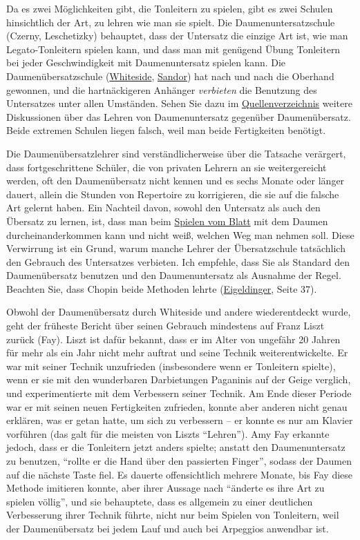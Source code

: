 Da es zwei Möglichkeiten gibt, die Tonleitern zu spielen, gibt es zwei Schulen hinsichtlich der Art, zu lehren wie man sie spielt.
Die Daumenuntersatzschule (Czerny, Leschetizky) behauptet, dass der Untersatz die einzige Art ist, wie man Legato-Tonleitern spielen kann, und dass man mit genügend Übung Tonleitern bei jeder Geschwindigkeit mit Daumenuntersatz spielen kann.
Die Daumenübersatzschule (\hyperref[Whiteside]{Whiteside}, \hyperref[Sandor]{Sandor}) hat nach und nach die Oberhand gewonnen, und die hartnäckigeren Anhänger \textit{verbieten} die Benutzung des Untersatzes unter allen Umständen.
Sehen Sie dazu im \hyperref[reference]{Quellenverzeichnis} weitere Diskussionen über das Lehren von Daumenuntersatz gegenüber Daumenübersatz.
Beide extremen Schulen liegen falsch, weil man beide Fertigkeiten benötigt.

Die Daumenübersatzlehrer sind verständlicherweise über die Tatsache verärgert, dass fortgeschrittene Schüler, die von privaten Lehrern an sie weitergereicht werden, oft den Daumenübersatz nicht kennen und es sechs Monate oder länger dauert, allein die Stunden von Repertoire zu korrigieren, die sie auf die falsche Art gelernt haben.
Ein Nachteil davon, sowohl den Untersatz als auch den Übersatz zu lernen, ist, dass man beim \hyperref[c1iii11]{Spielen vom Blatt} mit dem Daumen durcheinanderkommen kann und nicht weiß, welchen Weg man nehmen soll.
Diese Verwirrung ist ein Grund, warum manche Lehrer der Übersatzschule tatsächlich den Gebrauch des Untersatzes verbieten.
Ich empfehle, dass Sie als Standard den Daumenübersatz benutzen und den Daumenuntersatz als Ausnahme der Regel.
Beachten Sie, dass Chopin beide Methoden lehrte (\hyperref[Eigeldinger]{Eigeldinger}, Seite 37).

Obwohl der Daumenübersatz durch Whiteside und andere wiederentdeckt wurde, geht der früheste Bericht über seinen Gebrauch mindestens auf Franz Liszt zurück (Fay).
Liszt ist dafür bekannt, dass er im Alter von ungefähr 20 Jahren für mehr als ein Jahr nicht mehr auftrat und seine Technik weiterentwickelte.
Er war mit seiner Technik unzufrieden (insbesondere wenn er Tonleitern spielte), wenn er sie mit den wunderbaren Darbietungen Paganinis auf der Geige verglich, und experimentierte mit dem Verbessern seiner Technik.
Am Ende dieser Periode war er mit seinen neuen Fertigkeiten zufrieden, konnte aber anderen nicht genau erklären, was er getan hatte, um sich zu verbessern -- er konnte es nur am Klavier vorführen (das galt für die meisten von Liszts \enquote{Lehren}).
Amy Fay erkannte jedoch, dass er die Tonleitern jetzt anders spielte; anstatt den Daumenuntersatz zu benutzen, \enquote{rollte er die Hand über den passierten Finger}, sodass der Daumen auf die nächste Taste fiel.
Es dauerte offensichtlich mehrere Monate, bis Fay diese Methode imitieren konnte, aber ihrer Aussage nach \enquote{änderte es ihre Art zu spielen völlig}, und sie behauptete, dass es allgemein zu einer deutlichen Verbesserung ihrer Technik führte, nicht nur beim Spielen von Tonleitern, weil der Daumenübersatz bei jedem Lauf und auch bei Arpeggios anwendbar ist.


